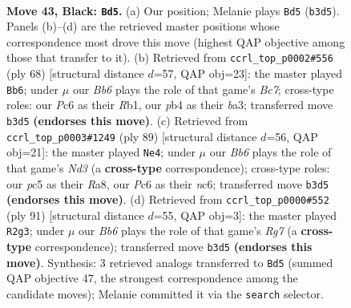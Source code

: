\documentclass[11pt]{article}
\begin{document}
\clearpage

\begin{figure}[p]\centering
\begin{subfigure}{0.46\textwidth}\centering
\resizebox{\linewidth}{!}{%
\newchessgame
\chessboard[
  setfen={2r1k1r1/p1p5/P1p3p1/2P2p1p/1P3P1P/1b4R1/8/RN2K3 b Q - 9 43},
  showmover=false,
  pgfstyle=straightmove, color=movearrow, markmove={b3-d5}
]}
\caption{}
\end{subfigure}\hfill
\begin{subfigure}{0.46\textwidth}\centering
\resizebox{\linewidth}{!}{%
\newchessgame
\chessboard[
  setfen={4r1k1/2B2pp1/p7/P3p3/2r1P2p/b4P1P/6P1/1R1R2K1 w - - 1 35},
  showmover=false,
  pgfstyle=straightmove, color=movearrow, markmove={c7-b6}
]}
\caption{}
\end{subfigure}
\\[4pt]
\begin{subfigure}{0.46\textwidth}\centering
\resizebox{\linewidth}{!}{%
\newchessgame
\chessboard[
  setfen={r4r2/3R1p1k/p1Nnp3/P2p2p1/3P1PP1/1P6/8/2R3K1 b - - 1 45},
  showmover=false,
  pgfstyle=straightmove, color=movearrow, markmove={d6-e4}
]}
\caption{}
\end{subfigure}\hfill
\begin{subfigure}{0.46\textwidth}\centering
\resizebox{\linewidth}{!}{%
\newchessgame
\chessboard[
  setfen={8/kp4r1/3p4/p1pPp3/P1P1K2p/2P4P/5Rr1/5R2 b - - 20 46},
  showmover=false,
  pgfstyle=straightmove, color=movearrow, markmove={g2-g3}
]}
\caption{}
\end{subfigure}
\caption{\textbf{Move 43, Black: \texttt{Bd5}.} (a) Our position; Melanie plays \texttt{Bd5} (\texttt{b3d5}). Panels (b)--(d) are the retrieved master positions whose correspondence most drove this move (highest QAP objective among those that transfer to it). (b) Retrieved from \texttt{ccrl\_top\_p0002\#556} (ply 68) [structural distance $d$=57, QAP obj=23]: the master played \texttt{Bb6}; under $\mu$ our \emph{Bb6} plays the role of that game's \emph{Bc7}; cross-type roles: our \emph{P}c6 as their \emph{R}b1, our \emph{p}b4 as their \emph{b}a3; transferred move \texttt{b3d5} \textbf{(endorses this move)}. (c) Retrieved from \texttt{ccrl\_top\_p0003\#1249} (ply 89) [structural distance $d$=56, QAP obj=21]: the master played \texttt{Ne4}; under $\mu$ our \emph{Bb6} plays the role of that game's \emph{Nd3} (a \textbf{cross-type} correspondence); cross-type roles: our \emph{p}c5 as their \emph{R}a8, our \emph{P}c6 as their \emph{n}c6; transferred move \texttt{b3d5} \textbf{(endorses this move)}. (d) Retrieved from \texttt{ccrl\_top\_p0000\#552} (ply 91) [structural distance $d$=55, QAP obj=3]: the master played \texttt{R2g3}; under $\mu$ our \emph{Bb6} plays the role of that game's \emph{Rg7} (a \textbf{cross-type} correspondence); transferred move \texttt{b3d5} \textbf{(endorses this move)}. Synthesis: 3 retrieved analogs transferred to \texttt{Bd5} (summed QAP objective 47, the strongest correspondence among the candidate moves); Melanie committed it via the \texttt{search} selector.}
\label{fig:thought-m85}
\end{figure}
\end{document}
